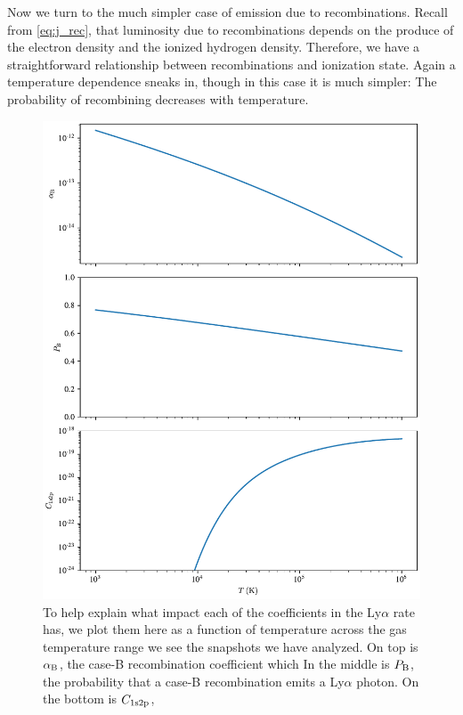 Now we turn to the much simpler case of emission due to recombinations.
Recall from \ref{eq:j_rec}, that luminosity due to recombinations depends on the produce of the electron density and the ionized hydrogen density.
Therefore, we have a straightforward relationship between recombinations and ionization state.
Again a temperature dependence sneaks in, though in this case it is much simpler: The probability of recombining decreases with temperature.
\begin{figure}
  \centering
    \includegraphics[width=\textwidth,height=\textheight,keepaspectratio]{figures/coefficients.pdf}
  \caption{
      To help explain what impact each of the coefficients in the Ly$\alpha$ rate has, we  plot them here as a function of temperature across the gas temperature range we see the snapshots we have analyzed.
      On top is $\alpha_{\rm{B}}$, the case-B recombination coefficient which
      In the middle is $P_{\rm{B}}$, the probability that a case-B recombination emits a Ly$\alpha$ photon.
      On the bottom is $C_{\rm{1s2p}}$, 
  }
  \label{fig:coefficients}
\end{figure}

